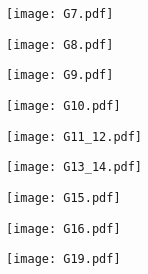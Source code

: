 \documentclass[a4paper,10pt]{article}
\begin{document}
\begin{figure}
	\centering
	\texttt{[image: G7.pdf]}
\end{figure}

\begin{figure}
	\centering
	\texttt{[image: G8.pdf]}
\end{figure}

\begin{figure}
	\centering
	\texttt{[image: G9.pdf]}
\end{figure}

\begin{figure}
	\centering
	\texttt{[image: G10.pdf]}
\end{figure}

\begin{figure}
	\centering
	\texttt{[image: G11\_12.pdf]}
\end{figure}

\begin{figure}
	\centering
	\texttt{[image: G13\_14.pdf]}
\end{figure}

\begin{figure}
	\centering
	\texttt{[image: G15.pdf]}
\end{figure}

\begin{figure}
	\centering
	\texttt{[image: G16.pdf]}
\end{figure}

\begin{figure}
	\centering
	\texttt{[image: G19.pdf]}
\end{figure}
\end{document}
